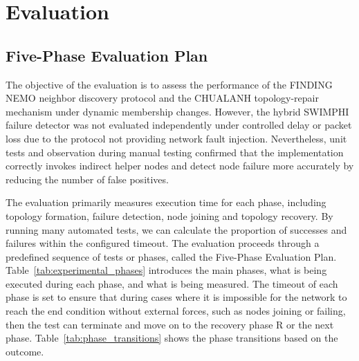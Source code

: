 \section{Evaluation}

\subsection{Five-Phase Evaluation Plan}
\label{subsec:five_phase_plan}

The objective of the evaluation is to assess the performance of the FINDING NEMO neighbor discovery protocol and the
CHUALANH topology-repair mechanism under dynamic membership changes. However, the hybrid SWIMPHI failure detector was
not evaluated independently under controlled delay or packet loss due to the protocol not providing network fault
injection. Nevertheless, unit tests and observation during manual testing confirmed that the implementation correctly
invokes indirect helper nodes and detect node failure more accurately by reducing the number of false positives.

The evaluation primarily measures execution time for each phase, including topology formation, failure detection, node
joining and topology recovery. By running many automated tests, we can calculate the proportion of successes and
failures within the configured timeout. The evaluation proceeds through a predefined sequence of tests or phases,
called the Five-Phase Evaluation Plan. Table~\ref{tab:experimental_phases} introduces the main phases, what is being
executed during each phase, and what is being measured. The timeout of each phase is set to ensure that during cases
where it is impossible for the network to reach the end condition without external forces, such as nodes joining or
failing, then the test can terminate and move on to the recovery phase R or the next phase.
Table~\ref{tab:phase_transitions} shows the phase transitions based on the outcome.

